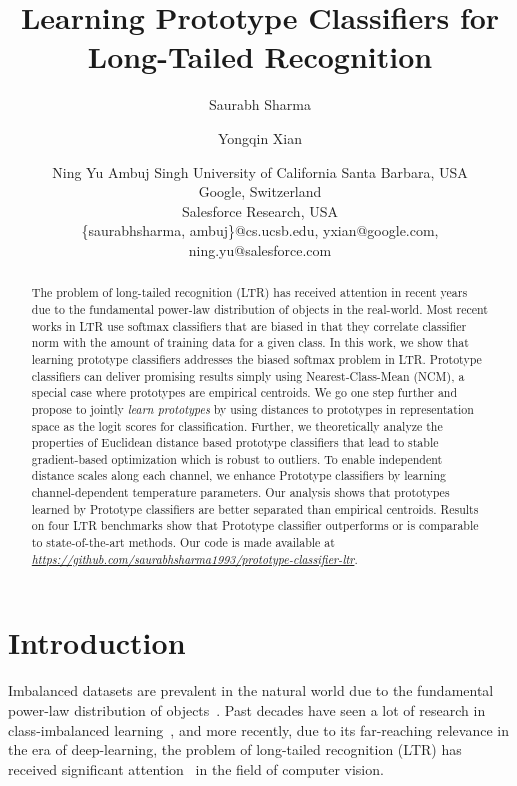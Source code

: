 \documentclass{article}
\title{Learning Prototype Classifiers for Long-Tailed Recognition}
\author{
Saurabh Sharma
\and
Yongqin Xian\and
Ning Yu\And
Ambuj Singh
\affiliations
University of California Santa Barbara, USA\\
Google, Switzerland\\
Salesforce Research, USA\\
\emails
\{saurabhsharma, ambuj\}@cs.ucsb.edu,
yxian@google.com,
ning.yu@salesforce.com
}
\begin{document}
\maketitle

\begin{abstract}
The problem of long-tailed recognition (LTR) has received attention in recent years due to the fundamental power-law distribution of objects in the real-world. Most recent works in LTR use softmax classifiers that are biased in that they correlate classifier norm with the amount of training data for a given class. In this work, we show that learning prototype classifiers addresses the biased softmax problem in LTR. Prototype classifiers can deliver promising results simply using Nearest-Class-Mean (NCM), a special case where prototypes are empirical centroids. We go one step further and propose to jointly \emph{learn prototypes} by using distances to prototypes in representation space as the logit scores for classification. Further, we theoretically analyze the properties of Euclidean distance based prototype classifiers that lead to stable gradient-based optimization which is robust to outliers. To enable independent distance scales along each channel, we enhance Prototype classifiers by learning channel-dependent temperature parameters. Our analysis shows that prototypes learned by Prototype classifiers are better separated than empirical centroids. Results on four LTR benchmarks show that Prototype classifier outperforms or is comparable to state-of-the-art methods. Our code is made available at \href{https://github.com/saurabhsharma1993/prototype-classifier-ltr}{\textit{https://github.com/saurabhsharma1993/prototype-classifier-ltr}}.
\end{abstract}

\section{Introduction}
\label{Introduction}

Imbalanced datasets are prevalent in the natural world due to the fundamental power-law distribution of objects~\cite{van2017devil}. Past decades have seen a lot of research in class-imbalanced learning~\cite{estabrooks2004multiple,he2009learning}, and more recently, due to its far-reaching relevance in the era of deep-learning, the problem of long-tailed recognition (LTR) has received significant attention~\cite{cui2019class,cao2019learning,liu2019large} in the field of computer vision. 
\end{document}
